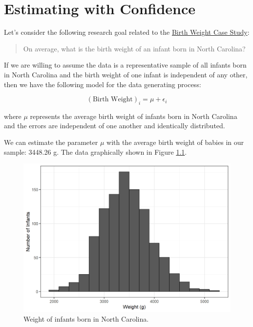\documentclass[
]{book}
\theoremstyle{plain}
\theoremstyle{mydefn}
\theoremstyle{myexmpl}
\theoremstyle{remark}
\begin{document}
\hypertarget{SingleConfInt}{%
\chapter{Estimating with Confidence}\label{SingleConfInt}}

Let's consider the following research goal related to the \protect\hyperlink{CaseBabies}{Birth Weight Case Study}:

\begin{quote}
On average, what is the birth weight of an infant born in North Carolina?
\end{quote}

If we are willing to assume the data is a representative sample of all infants born in North Carolina and the birth weight of one infant is independent of any other, then we have the following model for the data generating process:

\[(\text{Birth Weight})_i = \mu + \epsilon_i\]

where \(\mu\) represents the average birth weight of infants born in North Carolina and the errors are independent of one another and identically distributed.

We can estimate the parameter \(\mu\) with the average birth weight of babies in our sample: 3448.26 g. The data graphically shown in Figure \ref{fig:singleconfint-histogram}.

\begin{figure}

{\centering \includegraphics[width=0.8\linewidth]{./Images/singleconfint-histogram-1} 

}

\caption{Weight of infants born in North Carolina.}\label{fig:singleconfint-histogram}
\end{figure}
\end{document}
